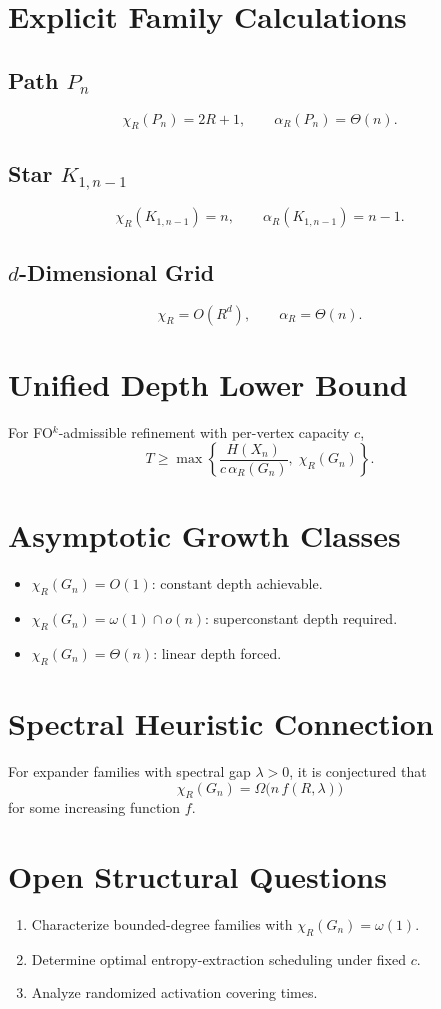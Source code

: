 \section{Explicit Family Calculations}

\subsection*{Path $P_n$}
\[
\chi_R(P_n)=2R+1,
\qquad
\alpha_R(P_n)=\Theta(n).
\]

\subsection*{Star $K_{1,n-1}$}
\[
\chi_R(K_{1,n-1})=n,
\qquad
\alpha_R(K_{1,n-1})=n-1.
\]

\subsection*{$d$-Dimensional Grid}
\[
\chi_R = O(R^d),
\qquad
\alpha_R=\Theta(n).
\]

\section{Unified Depth Lower Bound}

\begin{theorem}
For FO$^k$-admissible refinement with per-vertex capacity $c$,
\[
T
\ge
\max\!\left\{
\frac{H(X_n)}{c\,\alpha_R(G_n)},
\;
\chi_R(G_n)
\right\}.
\]
\end{theorem}

\section{Asymptotic Growth Classes}

\begin{itemize}
\item $\chi_R(G_n)=O(1)$: constant depth achievable.
\item $\chi_R(G_n)=\omega(1)\cap o(n)$: superconstant depth required.
\item $\chi_R(G_n)=\Theta(n)$: linear depth forced.
\end{itemize}

\section{Spectral Heuristic Connection}

For expander families with spectral gap $\lambda>0$, it is conjectured that
\[
\chi_R(G_n)
=
\Omega\!\bigl(n\,f(R,\lambda)\bigr)
\]
for some increasing function $f$.

\section{Open Structural Questions}

\begin{enumerate}
\item Characterize bounded-degree families with $\chi_R(G_n)=\omega(1)$.
\item Determine optimal entropy-extraction scheduling under fixed $c$.
\item Analyze randomized activation covering times.
\end{enumerate}
